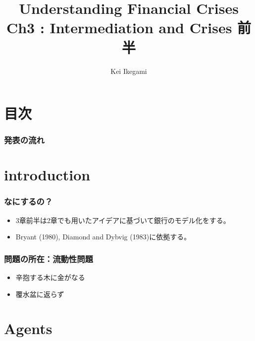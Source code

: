 \documentclass[dvipdfmx, 12pt]{beamer}
\title{Understanding Financial Crises\\Ch3 : Intermediation and Crises 前半}
\author{Kei Ikegami}
\begin{document}
\newcommand{\argmin}{\mathop{\rm arg~min}\limits}

\frame{\maketitle}

\section*{目次}
\begin{frame} \frametitle{発表の流れ}
\tableofcontents
\end{frame}

\section{introduction}
\begin{frame}\frametitle{なにするの？}
	\begin{itemize}
		\item 3章前半は2章でも用いたアイデアに基づいて銀行のモデル化をする。
		\item Bryant (1980), Diamond and Dybvig (1983)に依拠する。
	\end{itemize}
\end{frame}
\begin{frame}\frametitle{問題の所在：流動性問題}
	\begin{itemize}
		\item 辛抱する木に金がなる
		\item 覆水盆に返らず
	\end{itemize}
\end{frame}


\section{Agents}
\end{document}
